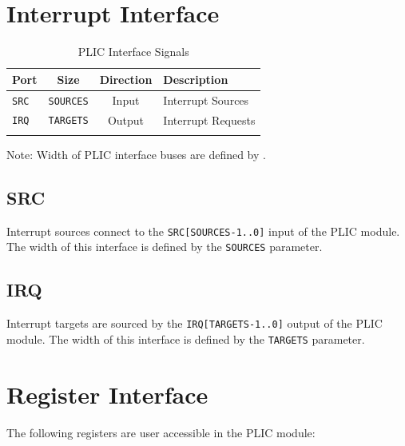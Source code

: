 \section{Interrupt Interface} 


\begin{longtable}[c]{@{\extracolsep{\fill}}lccl@{\extracolsep{\fill}}}	
	\toprule
	\textbf{Port} & \textbf{Size}    & \textbf{Direction} & \textbf{Description}\\
	\midrule 
	\endhead
	\texttt{SRC}  & \texttt{SOURCES} & Input  & Interrupt Sources\\
	\texttt{IRQ}  & \texttt{TARGETS} & Output & Interrupt Requests \\
	\bottomrule 	
	\caption{PLIC Interface Signals} 
	\label{tab:PLICIF2}

\end{longtable}


Note: Width of PLIC interface buses are defined by
. 

\subsection{SRC}

Interrupt sources connect to the \texttt{SRC{[}SOURCES-1..0{]}} input of
the PLIC module. The width of this interface is defined by the \texttt{SOURCES} parameter. 

\subsection{IRQ}

Interrupt targets are sourced by the \texttt{IRQ{[}TARGETS-1..0{]}}
output of the PLIC module. The width of this interface is defined by the
\texttt{TARGETS} parameter.

\section{Register Interface}

The following registers are user accessible in the PLIC module:

